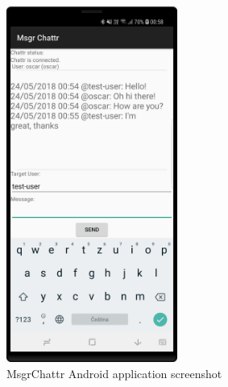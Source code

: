\begin{figure}[!ht]
	\centering
	\includegraphics[width=0.5\textwidth]{figures/04_implementation/chattr-android}
    \caption{MsgrChattr Android application screenshot}
    \label{fig:chattr-android}
\end{figure}
